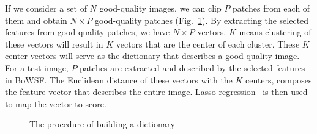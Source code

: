 If we consider a set of $N$ good-quality images, we can clip $P$ patches from each of them and obtain $N\times P$ good-quality patches (Fig.~\ref{fig:dic}). By extracting the selected features from good-quality patches, we have $N\times P$ vectors. $K$-means clustering of these vectors will result in $K$ vectors that are the center of each cluster. These $K$ center-vectors will serve as the dictionary that describes a good quality image. For a test image, $P$ patches are extracted and described by the selected features in BoWSF. The Euclidean distance of these vectors with the $K$ centers, composes the feature vector that describes the entire image. Lasso regression~\cite{Tibshirani1996} is then used to map the vector to score.
\begin{figure}
    \centering
    \caption{The procedure of building a dictionary}
    \label{fig:dic}
\end{figure}

